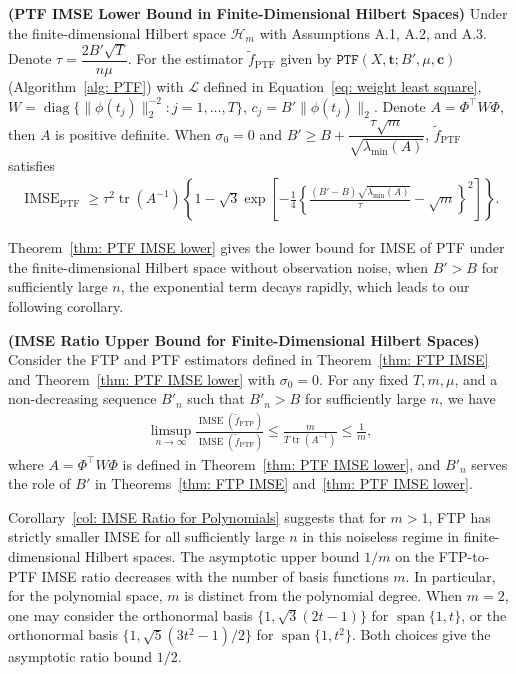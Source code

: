 \documentclass[twoside,11pt]{article}
\newcommand{\Set}[1]{\left\{{#1}\right\}} %
\begin{document}
\begin{theorem}\textup{\textbf{(PTF IMSE Lower Bound in Finite-Dimensional Hilbert Spaces)}}
\label{thm: PTF IMSE lower}
Under the finite-dimensional Hilbert space $\mathcal{H}_m$ with Assumptions A.1, A.2, and A.3. Denote $\tau=\dfrac{2B'\sqrt{T}}{n\mu}.$ For the estimator $\widetilde{f}_{\mathrm{PTF}}$ given by $\mathtt{PTF}(X, \mathbf{t}; B',\mu, \mathbf{c})$ (Algorithm~\ref{alg: PTF}) with $\mathcal{L}$ defined in Equation~\eqref{eq: weight least square}, $W=\operatorname{diag}\{\|\phi(t_j)\|_2^{-2}:j=1,\ldots,T\}$, $c_j = B'\|\phi(t_j)\|_2$. Denote $A = \Phi^\top W\Phi$, then $A$ is positive definite. When $\sigma_0 = 0$ and $B'\geq B + \dfrac{\tau\sqrt m}{\sqrt{\lambda_{\min}(A)}}$, $\widetilde{f}_{\mathrm{PTF}}$ satisfies
\begin{equation}
\begin{aligned}
\operatorname{IMSE}_{\mathrm{PTF}}
\geq
\tau^2\operatorname{tr}(A^{-1})
\Set{1-
\sqrt{3}
\exp\left[
-\frac14
\left\{
\frac{(B'-B)\sqrt{\lambda_{\min}(A)}}{\tau}
-\sqrt m
\right\}^2
\right]}.
\end{aligned}
\label{eq: PTF lower bound}
\end{equation}
\end{theorem}
Theorem~\ref{thm: PTF IMSE lower} gives the lower bound for IMSE of PTF under the finite-dimensional Hilbert space without observation noise, when $B'>B$ for sufficiently large $n$, the exponential term decays rapidly, which leads to our following corollary.
\begin{corollary}\textup{\textbf{(IMSE Ratio Upper Bound for Finite-Dimensional Hilbert Spaces)}}
    Consider the FTP and PTF estimators defined in Theorem~\ref{thm: FTP IMSE} and Theorem~\ref{thm: PTF IMSE lower} with $\sigma_0 = 0$. For any fixed $T, m, \mu$, and a non-decreasing sequence $B'_n$ such that $B'_n>B$ for sufficiently large $n$, we have
    \begin{equation}
        \begin{aligned}
            \limsup_{n\to\infty}
            \frac{\operatorname{IMSE}(\widetilde f_{\mathrm{FTP}})}
            {\operatorname{IMSE}(\widetilde f_{\mathrm{PTF}})}
            \le\frac{m}{T\operatorname{tr}(A^{-1})}\le\frac1m,
        \end{aligned}
    \end{equation}
    where $A=\Phi^\top W\Phi$ is defined in Theorem~\ref{thm: PTF IMSE lower}, and $B'_n$ serves the role of $B'$ in Theorems~\ref{thm: FTP IMSE} and~\ref{thm: PTF IMSE lower}.
    \label{col: IMSE Ratio for Polynomials}
\end{corollary}
Corollary~\ref{col: IMSE Ratio for Polynomials} suggests that for $m>1$, FTP has strictly smaller IMSE for all sufficiently large $n$ in this noiseless regime in finite-dimensional Hilbert spaces. The asymptotic upper bound $1/m$ on the FTP-to-PTF IMSE ratio decreases with the number of basis functions $m$. In particular, for the polynomial space, $m$ is distinct from the polynomial degree. When $m=2$, one may consider the orthonormal basis $\{1,\sqrt{3}(2t-1)\}$ for $\operatorname{span}\{1,t\}$, or the orthonormal basis $\{1,\sqrt{5}(3t^2-1)/2\}$ for $\operatorname{span}\{1,t^2\}$. Both choices give the asymptotic ratio bound $1/2$.
\end{document}
